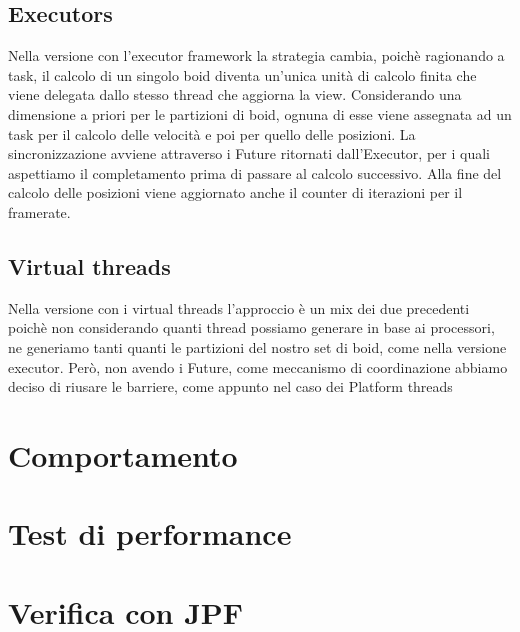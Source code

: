 \documentclass[a4paper,12pt]{report}
\begin{document}
\section{Executors}
Nella versione con l'executor framework la strategia cambia, poichè ragionando a task, il calcolo di un singolo boid
diventa un'unica unità di calcolo finita che viene delegata dallo stesso thread che aggiorna la view.
Considerando una dimensione a priori per le partizioni di boid, ognuna di esse viene assegnata ad un task per il calcolo
delle velocità e poi per quello delle posizioni. La sincronizzazione avviene attraverso i Future ritornati dall'Executor,
per i quali aspettiamo il completamento prima di passare al calcolo successivo. Alla fine del calcolo delle posizioni
viene aggiornato anche il counter di iterazioni per il framerate.

\section{Virtual threads}
Nella versione con i virtual threads l'approccio è un mix dei due precedenti poichè non considerando quanti thread
possiamo generare in base ai processori, ne generiamo tanti quanti le partizioni del nostro set di boid, come nella versione
executor. Però, non avendo i Future, come meccanismo di coordinazione abbiamo deciso di riusare le barriere, come appunto
nel caso dei Platform threads

\chapter{Comportamento}

\chapter{Test di performance}

\chapter{Verifica con JPF}
\end{document}

